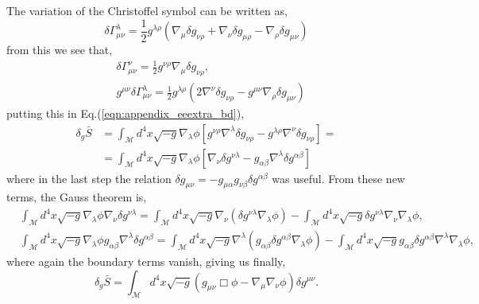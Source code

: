 The variation of the Christoffel symbol can be written as,
\begin{equation}
    \delta \Gamma_{\mu \nu}^\lambda=\frac{1}{2} g^{\lambda \rho}\left(\nabla_\mu \delta g_{\nu \rho}+\nabla_\nu \delta g_{\mu \rho}-\nabla_\rho \delta g_{\mu \nu}\right)
\end{equation}
from this we see that,
\begin{align}
    &\delta \Gamma_{\mu \nu}^\nu = \frac{1}{2}g^{\nu \rho}\nabla_\mu \delta g_{\nu \rho},\\
    &g^{\mu\nu}\delta \Gamma_{\mu \nu}^\lambda=\frac{1}{2} g^{\lambda \rho}\left(2\nabla^\nu \delta g_{\nu \rho}-g^{\mu\nu}\nabla_\rho \delta g_{\mu \nu}\right)
\end{align}
putting this in Eq.(\ref{eqn:appendix_eeextra_bd}),
\begin{align}
    \delta_g \bar{S}&=\int_{\mathcal{M}} d^4 x \sqrt{-g}\nabla_\lambda\phi\left[g^{\nu \rho}\nabla^\lambda \delta g_{\nu \rho}-g^{\lambda \rho}\nabla^\nu \delta g_{\nu \rho}\right]=\nonumber\\
    &=\int_{\mathcal{M}} d^4 x \sqrt{-g}\nabla_\lambda\phi\left[\nabla_\nu\delta g^{\nu\lambda}-g_{\alpha\beta}\nabla^\lambda \delta g^{\alpha\beta}\right]
    \label{eqn:appendix_eeeextra_bd}
\end{align}
where in the last step the relation $\delta g_{\mu \nu}=-g_{\mu \alpha} g_{\nu \beta} \delta g^{\alpha \beta}$ was useful. From these new terms, the Gauss theorem is,
\begin{align}
    &\int_{\mathcal{M}} d^4 x \sqrt{-g}\nabla_\lambda\phi\nabla_\nu\delta g^{\nu\lambda}=\int_{\mathcal{M}} d^4 x \sqrt{-g}\nabla_\nu\left(\delta g^{\nu\lambda}\nabla_\lambda\phi\right) - \int_{\mathcal{M}} d^4 x \sqrt{-g}\delta g^{\nu\lambda}\nabla_\nu \nabla_\lambda\phi, \\
    &\int_{\mathcal{M}} d^4 x \sqrt{-g}\nabla_\lambda\phi g_{\alpha\beta}\nabla^\lambda \delta g^{\alpha\beta}=\int_{\mathcal{M}} d^4 x \sqrt{-g}\nabla^\lambda\left(g_{\alpha\beta}\delta g^{\alpha\beta}\nabla_\lambda\phi \right) - \int_{\mathcal{M}} d^4 x \sqrt{-g}g_{\alpha\beta}\delta g^{\alpha\beta}\nabla^\lambda\nabla_\lambda\phi ,
\end{align}
where again the boundary terms vanish, giving us finally,
\begin{equation}
    \delta_g \bar{S}=\int_{\mathcal{M}} d^4 x \sqrt{-g}\left(g_{\mu\nu}\Box\phi-\nabla_\mu\nabla_\nu\phi\right)\delta g^{\mu\nu}.
\end{equation}

